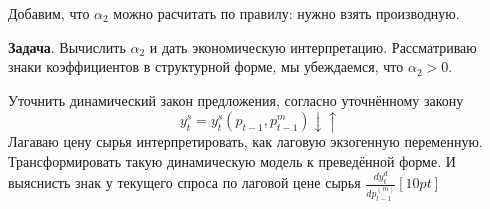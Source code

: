 \documentclass[12pt,a4paper]{article}
\begin{document}
Добавим, что $\alpha_2$ можно расчитать по правилу: нужно взять производную.

\textbf{Задача}. Вычислить $\alpha_2$ и дать экономическую интерпретацию. Рассматриваю знаки коэффициентов в структурной форме, мы убеждаемся, что $\alpha_2 > 0$.

 Уточнить динамический закон предложения, согласно уточнённому закону
$$y_t^s = y_t^s(p_{t-1}, p_{t-1}^{m}) \downarrow \uparrow $$
Лагаваю цену сырья интерпретировать, как лаговую экзогенную переменную. Трансформировать такую динамическую модель к преведённой форме. И выяснисть знак у текущего спроса по лаговой цене сырья $\displaystyle{\frac{d y_t^d}{d p_{t-1}^{(m)}}}[10pt]$
\end{document}
